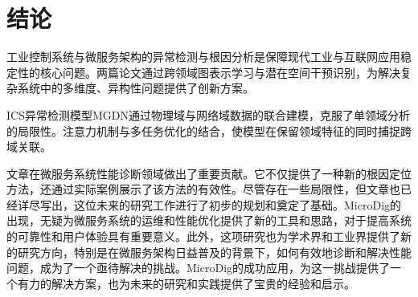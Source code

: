 \section{结论}

工业控制系统与微服务架构的异常检测与根因分析是保障现代工业与互联网应用稳定性的核心问题。两篇论文通过跨领域图表示学习与潜在空间干预识别，为解决复杂系统中的多维度、异构性问题提供了创新方案。

ICS异常检测模型MGDN通过物理域与网络域数据的联合建模，克服了单领域分析的局限性。注意力机制与多任务优化的结合，使模型在保留领域特征的同时捕捉跨域关联。

文章\cite{tao2024diagnosing}在微服务系统性能诊断领域做出了重要贡献。它不仅提供了一种新的根因定位方法，还通过实际案例展示了该方法的有效性。尽管存在一些局限性，但文章也已经详尽写出，这位未来的研究工作进行了初步的规划和奠定了基础。MicroDig的出现，无疑为微服务系统的运维和性能优化提供了新的工具和思路，对于提高系统的可靠性和用户体验具有重要意义。此外，这项研究也为学术界和工业界提供了新的研究方向，特别是在微服务架构日益普及的背景下，如何有效地诊断和解决性能问题，成为了一个亟待解决的挑战。MicroDig的成功应用，为这一挑战提供了一个有力的解决方案，也为未来的研究和实践提供了宝贵的经验和启示。
